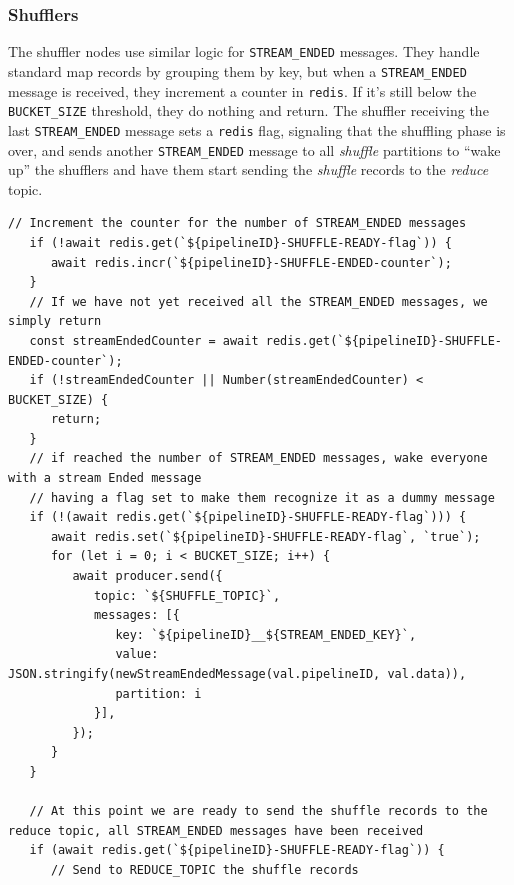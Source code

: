 \subsubsection{Shufflers}
The shuffler nodes use similar logic for \verb|STREAM_ENDED| messages. 
They handle standard map records by grouping them by key, but when a \verb|STREAM_ENDED| message is received, they increment a counter in \texttt{redis}. If it's still below the \verb|BUCKET_SIZE| threshold, they do nothing and return.
The shuffler receiving the last \verb|STREAM_ENDED| message sets a \texttt{redis} flag, signaling that the shuffling phase is over, and sends another \verb|STREAM_ENDED| message to all \textit{shuffle} partitions to ``wake up'' the shufflers and have them start sending the \textit{shuffle} records to the \textit{reduce} topic.

\begin{lstlisting}[label={lst:streamEndedShuffler}, caption={Handling the STREAM\_ENDED message in a shuffler},captionpos={top}]
   // Increment the counter for the number of STREAM_ENDED messages
   if (!await redis.get(`${pipelineID}-SHUFFLE-READY-flag`)) {
      await redis.incr(`${pipelineID}-SHUFFLE-ENDED-counter`);
   }
   // If we have not yet received all the STREAM_ENDED messages, we simply return
   const streamEndedCounter = await redis.get(`${pipelineID}-SHUFFLE-ENDED-counter`);
   if (!streamEndedCounter || Number(streamEndedCounter) < BUCKET_SIZE) {
      return;
   }
   // if reached the number of STREAM_ENDED messages, wake everyone with a stream Ended message 
   // having a flag set to make them recognize it as a dummy message
   if (!(await redis.get(`${pipelineID}-SHUFFLE-READY-flag`))) {
      await redis.set(`${pipelineID}-SHUFFLE-READY-flag`, `true`);
      for (let i = 0; i < BUCKET_SIZE; i++) {
         await producer.send({
            topic: `${SHUFFLE_TOPIC}`,
            messages: [{
               key: `${pipelineID}__${STREAM_ENDED_KEY}`,
               value: JSON.stringify(newStreamEndedMessage(val.pipelineID, val.data)),
               partition: i
            }],
         });
      }
   }
  
   // At this point we are ready to send the shuffle records to the reduce topic, all STREAM_ENDED messages have been received
   if (await redis.get(`${pipelineID}-SHUFFLE-READY-flag`)) {
      // Send to REDUCE_TOPIC the shuffle records
\end{lstlisting}


